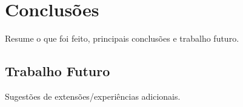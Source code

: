 \section{Conclusões}
\label{sec:conclusion}

Resume o que foi feito, principais conclusões e trabalho futuro.

\subsection{Trabalho Futuro}

Sugestões de extensões/experiências adicionais.
